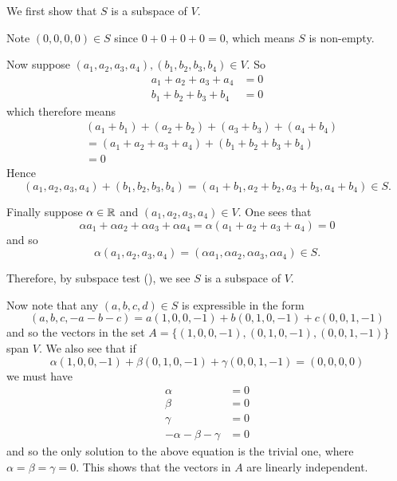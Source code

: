 \begin{questions}
\begin{partquestions}{\alph*}
        \item We first show that $S$ is a subspace of $V$.

        Note $(0, 0, 0, 0) \in S$ since $0 + 0 + 0 + 0 = 0$, which means $S$ is non-empty.

        Now suppose $(a_1, a_2, a_3, a_4), (b_1, b_2, b_3, b_4) \in V$. So
        \begin{align*}
            a_1 + a_2 + a_3 + a_4 &= 0\\
            b_1 + b_2 + b_3 + b_4 &= 0
        \end{align*}
        which therefore means
        \begin{align*}
            &(a_1 + b_1) + (a_2 + b_2) + (a_3 + b_3) + (a_4 + b_4)\\
            &= (a_1 + a_2 + a_3 + a_4) + (b_1 + b_2 + b_3 + b_4)\\
            &= 0
        \end{align*}
        Hence
        \[
            (a_1, a_2, a_3, a_4) + (b_1, b_2, b_3, b_4) = (a_1 + b_1, a_2 + b_2, a_3 + b_3, a_4 + b_4) \in S.
        \]

        Finally suppose $\alpha \in \mathbb{R}$ and $(a_1, a_2, a_3, a_4) \in V$. One sees that
        \[
            \alpha a_1 + \alpha a_2 + \alpha a_3 + \alpha a_4 = \alpha(a_1 + a_2 + a_3 + a_4) = 0
        \]
        and so
        \[
            \alpha(a_1, a_2, a_3, a_4) = (\alpha a_1, \alpha a_2 , \alpha a_3, \alpha a_4) \in S.
        \]

        Therefore, by subspace test (), we see $S$ is a subspace of $V$.

        Now note that any $(a, b, c, d) \in S$ is expressible in the form
        \[
            (a, b, c, -a-b-c) = a(1, 0, 0, -1) + b(0, 1, 0, -1) + c(0, 0, 1, -1)
        \]
        and so the vectors in the set $A = \{(1, 0, 0, -1), (0, 1, 0, -1), (0, 0, 1, -1)\}$ span $V$. We also see that if
        \[
            \alpha(1, 0, 0, -1) + \beta(0, 1, 0, -1) + \gamma(0, 0, 1, -1) = (0, 0, 0, 0)
        \]
        we must have
        \begin{align*}
            \alpha &= 0\\
            \beta &= 0\\
            \gamma &= 0\\
            -\alpha - \beta - \gamma &= 0
        \end{align*}
        and so the only solution to the above equation is the trivial one, where $\alpha = \beta = \gamma = 0$. This shows that the vectors in $A$ are linearly independent.


\end{partquestions}
\end{questions}
